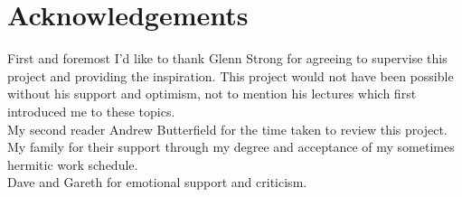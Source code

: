 \section*{Acknowledgements}
First and foremost I'd like to thank Glenn Strong for agreeing
to supervise this project and providing the inspiration. This
project would not have been possible without his support and
optimism, not to mention his lectures which first introduced
me to these topics. \\ 

\noindent My second reader Andrew Butterfield for the time taken to review
this project. \\

\noindent My family for their support through my degree and acceptance of
my sometimes hermitic work schedule. \\

\noindent Dave and Gareth for emotional support and criticism. 



